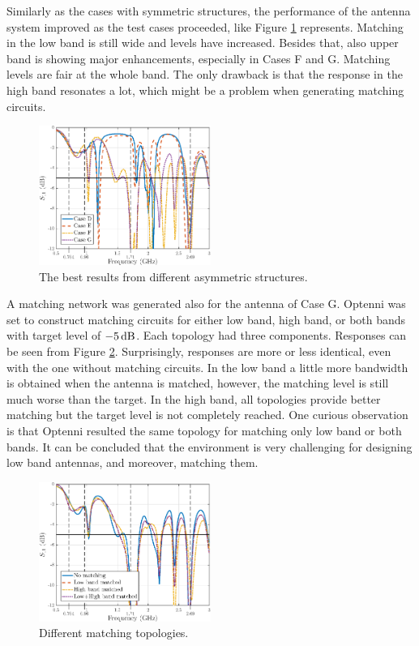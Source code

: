 Similarly as the cases with symmetric structures, the performance of the antenna system improved as the test cases proceeded, like Figure \ref{fig:concept3} represents. Matching in the low band is still wide and levels have increased. Besides that, also upper band is showing major enhancements, especially in Cases F and G. Matching levels are fair at the whole band. The only drawback is that the response in the high band resonates a lot, which might be a problem when generating matching circuits.
\begin{figure}[H]
    \centering
    \includegraphics[width=0.5\textwidth]{img/concept3.eps}
    \caption{The best results from different asymmetric structures.}
    \label{fig:concept3}
\end{figure}

A matching network was generated also for the antenna of Case G. Optenni was set to construct matching circuits for either low band, high band, or both bands with target level of $-5\,\mathrm{dB}$. Each topology had three components. Responses can be seen from Figure \ref{fig:concept3_match}. Surprisingly, responses are more or less identical, even with the one without matching circuits. In the low band a little more bandwidth is obtained when the antenna is matched, however, the matching level is still much worse than the target. In the high band, all topologies provide better matching but the target level is not completely reached. One curious observation is that Optenni resulted the same topology for matching only low band or both bands. It can be concluded that the environment is very challenging for designing low band antennas, and moreover, matching them.
\begin{figure}[H]
    \centering
    \includegraphics[width=0.5\textwidth]{img/concept3_match.eps}
    \caption{Different matching topologies.}
    \label{fig:concept3_match}
\end{figure}

